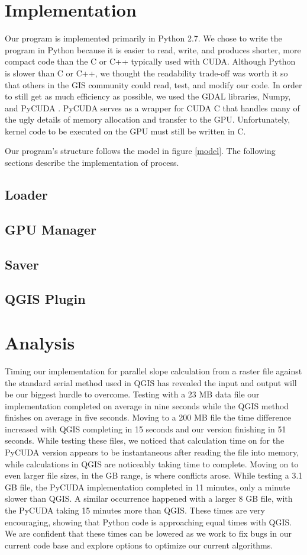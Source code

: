 \documentclass[journal]{IEEEtran}
\begin{document}
\section{Implementation} \label{implementation}
    Our program is implemented primarily in Python 2.7. We chose to write the
    program in Python because it is easier to read, write, and produces
    shorter, more compact code than the C or C++ typically used with CUDA.
    Although Python is slower than C or C++, we thought the readability
    trade-off was worth it so that others in the GIS community could read,
    test, and modify our code. In order to still get as much efficiency as
    possible, we used the GDAL libraries, Numpy, and PyCUDA \cite{pycuda_1}
    \cite{pycuda_2}. PyCUDA serves as a wrapper for CUDA C that handles many of
    the ugly details of memory allocation and transfer to the GPU.
    Unfortunately, kernel code to be executed on the GPU must still be written
    in C. 
    
    Our program's structure follows the model in figure \ref{model}. The
    following sections describe the implementation of process.
    \subsection{Loader}
    \subsection{GPU Manager}
    \subsection{Saver}
    \subsection{QGIS Plugin}

\section{Analysis}
Timing our implementation for parallel slope calculation from a raster file
against the standard serial method used in QGIS has revealed the input and
output will be our biggest hurdle to overcome. Testing with a 23 MB data file
our implementation completed on average in nine seconds while the QGIS method
finishes on average in five seconds. Moving to a 200 MB file the time
difference increased with QGIS completing in 15 seconds and our version
finishing in 51 seconds. While testing these files, we noticed that calculation
time on for the PyCUDA version appears to be instantaneous after reading the
file into memory, while calculations in QGIS are noticeably taking time to
complete. Moving on to even larger file sizes, in the GB range, is where
conflicts arose. While testing  a 3.1 GB file, the PyCUDA implementation completed
in 11 minutes, only a minute slower than QGIS. A similar occurrence happened with
a larger 8 GB file, with the PyCUDA taking 15 minutes more than QGIS. These times
are very encouraging, showing that Python code is approaching equal times with QGIS.
We are confident that these times can be lowered as we work to fix bugs in our
current code base and explore options to optimize our current algorithms.
\end{document}

